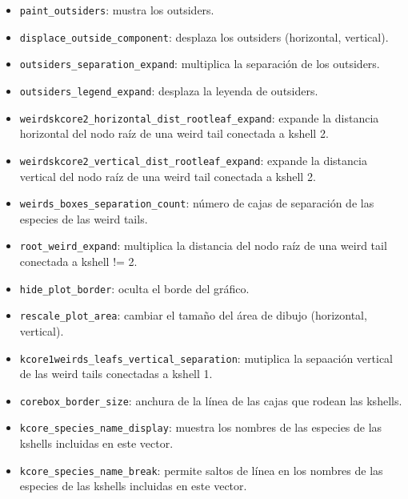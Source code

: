 \begin{itemize}
\item \texttt{paint\_outsiders}: mustra los outsiders.

\item \texttt{displace\_outside\_component}: desplaza los outsiders (horizontal, vertical).

\item \texttt{outsiders\_separation\_expand}: multiplica la separación de los outsiders.

\item \texttt{outsiders\_legend\_expand}: desplaza la leyenda de outsiders.

\item \texttt{weirdskcore2\_horizontal\_dist\_rootleaf\_expand}: expande la distancia horizontal del nodo raíz de una weird tail conectada a kshell 2.

\item \texttt{weirdskcore2\_vertical\_dist\_rootleaf\_expand}: expande la distancia vertical del nodo raíz de una weird tail conectada a kshell 2.

\item \texttt{weirds\_boxes\_separation\_count}: número de cajas de separación de las especies de las weird tails.

\item \texttt{root\_weird\_expand}: multiplica la distancia del nodo raíz de una weird tail conectada a kshell != 2.

\item \texttt{hide\_plot\_border}: oculta el borde del gráfico.

\item \texttt{rescale\_plot\_area}: cambiar el tamaño del área de dibujo (horizontal, vertical).

\item \texttt{kcore1weirds\_leafs\_vertical\_separation}: mutiplica la sepaación vertical de las weird tails conectadas a kshell 1.

\item \texttt{corebox\_border\_size}: anchura de la línea de las cajas que rodean las kshells.

\item \texttt{kcore\_species\_name\_display}: muestra los nombres de las especies de las kshells incluidas en este vector.

\item \texttt{kcore\_species\_name\_break}: permite saltos de línea en los nombres de las especies de las kshells incluidas en este vector.


\end{itemize}
